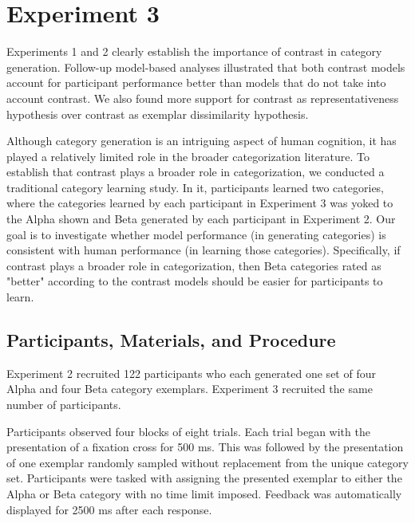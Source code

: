 

% 
\section{Experiment 3}

Experiments 1 and 2 clearly establish the importance of contrast in category
generation. Follow-up model-based analyses illustrated that both contrast models
account for participant performance better than models that do not take into
account contrast. We also found more support for contrast as representativeness
hypothesis over contrast as exemplar dissimilarity hypothesis.

Although category generation is an intriguing aspect of human cognition, it has
played a relatively limited role in the broader categorization literature. To
establish that contrast plays a broader role in categorization, we conducted a
traditional category learning study. In it, participants learned two categories,
where the categories learned by each participant in Experiment 3 was yoked to
the Alpha shown and Beta generated by each participant in Experiment 2. Our goal
is to investigate whether model performance (in generating categories) is
consistent with human performance (in learning those categories).
Specifically, if contrast plays a
broader role in categorization, then Beta categories rated as "better" according
to the contrast models should be easier for participants to learn.

\subsection{Participants, Materials, and Procedure}

Experiment 2 recruited 122 participants who each generated one set of four Alpha
and four Beta category exemplars. Experiment 3 recruited the same number of
participants.

Participants observed four blocks of eight trials. Each trial began with the
presentation of a fixation cross for 500 ms. This was followed by the
presentation of one exemplar randomly sampled without replacement from the
unique category set. Participants were tasked with assigning the presented
exemplar to either the Alpha or Beta category with no time limit imposed.
Feedback was automatically displayed for 2500 ms after each response.

